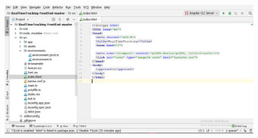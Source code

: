 \begin{enumerate}
\begin{figure}[!h]
		\centerline{\includegraphics[width=1.1\textwidth]{code19}}
	\end{figure}
\end{enumerate}
                      